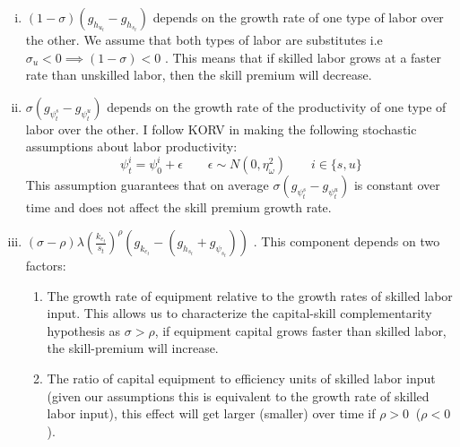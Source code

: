 \documentclass[12pt]{article}
\begin{document}
\begin{enumerate}[(i)]
 \item $(1-\sigma)(g_{h_{u_t}}-g_{h_{s_t}})$ depends on the growth rate of one type of labor over the other. We assume that both types of labor are substitutes i.e $\sigma_u < 0 \implies (1-\sigma) < 0$ . This means that if skilled labor grows at a faster rate than unskilled labor, then the skill premium will decrease.
 \item $\sigma\left(g_{\psi^s_t}-g_{\psi^u_t}\right)$ depends on the growth rate of the productivity of one type of labor over the other. I follow KORV in making the following stochastic assumptions about labor productivity:
 \begin{equation}\label{eq:stochastic_labor_productivity}
 \psi^i_t = \psi^i_0 + \epsilon \qquad \epsilon \sim N(0, \eta_\omega^2) \qquad i\in\{s,u\}
 \end{equation}
 This assumption guarantees that on average $\sigma (g_{\psi^s_t}-g_{\psi^u_t} )$ is constant over time and does not affect the skill premium growth rate. 
 \item $(\sigma-\rho) \lambda\left(\frac{k_{e_t}}{s_{t}}\right)^{\rho}\left(g_{k_{e_t}}-(g_{h_{s_t}}+g_{\psi_{s_t}})\right)$ . This component depends on two factors:
 \begin{enumerate}
 \item The growth rate of equipment relative to the growth rates of skilled labor input. This allows us to characterize the capital-skill complementarity hypothesis as $\sigma > \rho$, if equipment capital grows faster than skilled labor, the skill-premium will increase.
 \item The ratio of capital equipment to efficiency units of skilled labor input (given our assumptions this is equivalent to the growth rate of skilled labor input), this effect will get larger (smaller) over time if $\rho > 0\:$ ($\rho < 0$). 
 \end{enumerate}
\end{enumerate}
\end{document}
